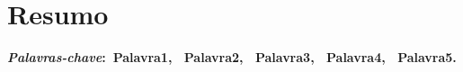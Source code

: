 \chapter*{Resumo}

\noindent \lipsum[1]

\vspace{5mm}
\noindent\textbf{\textit{Palavras-chave}:~Palavra1, ~Palavra2, ~Palavra3, ~Palavra4, ~Palavra5.}
